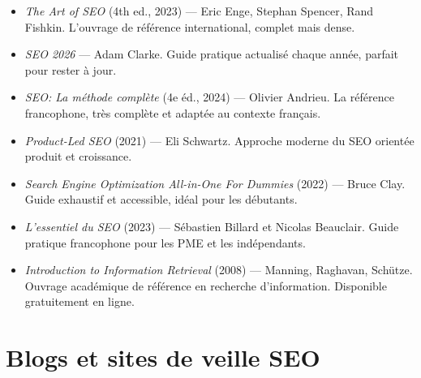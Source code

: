 \documentclass[12pt,a4paper,twoside]{report}
\begin{document}
\begin{itemize}
    \item \textit{The Art of SEO} (4th ed., 2023) — Eric Enge, Stephan Spencer, Rand Fishkin. L'ouvrage de référence international, complet mais dense.
    \item \textit{SEO 2026} — Adam Clarke. Guide pratique actualisé chaque année, parfait pour rester à jour.
    \item \textit{SEO: La méthode complète} (4e éd., 2024) — Olivier Andrieu. La référence francophone, très complète et adaptée au contexte français.
    \item \textit{Product-Led SEO} (2021) — Eli Schwartz. Approche moderne du SEO orientée produit et croissance.
    \item \textit{Search Engine Optimization All-in-One For Dummies} (2022) — Bruce Clay. Guide exhaustif et accessible, idéal pour les débutants.
    \item \textit{L'essentiel du SEO} (2023) — Sébastien Billard et Nicolas Beauclair. Guide pratique francophone pour les PME et les indépendants.
    \item \textit{Introduction to Information Retrieval} (2008) — Manning, Raghavan, Schütze. Ouvrage académique de référence en recherche d'information. Disponible gratuitement en ligne.
\end{itemize}

\section*{Blogs et sites de veille SEO}
\end{document}
